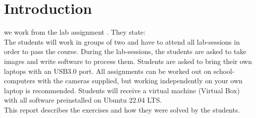 \section{Introduction}
\label{sec:introduction}

we work from the lab assignment \cite{Lab_Assignments}. They state: \\

The students will work in groups of two and have to attend all lab-sessions in order to pass the course.
During the lab-sessions, the students are asked to take images and write software to process them.
Students are asked to bring their own laptops with an USB3.0 port. All assignments can be worked out on school-computers with the cameras supplied, but working independently on your own laptop is recommended. Students will receive a virtual machine (Virtual Box) with all software preinstalled on Ubuntu 22.04 LTS. \\

This report describes the exercises and how they were solved by the students.
